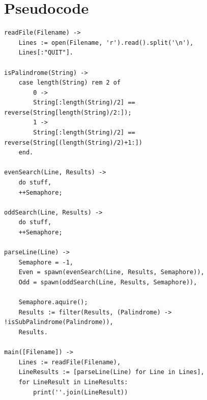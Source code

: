 \documentclass{article}
\begin{document}
\newpage

\section{Pseudocode}
\vspace{-12pt}
\begin{verbatim}
readFile(Filename) ->
    Lines := open(Filename, 'r').read().split('\n'),
    Lines[:"QUIT"].

isPalindrome(String) ->
    case length(String) rem 2 of
        0 ->
        String[:length(String)/2] == reverse(String[length(String)/2:]);
        1 ->
        String[:length(String)/2] == reverse(String[(length(String)/2)+1:])
    end.

evenSearch(Line, Results) ->
    do stuff,
    ++Semaphore;

oddSearch(Line, Results) ->
    do stuff,
    ++Semaphore;

parseLine(Line) ->
    Semaphore = -1,
    Even = spawn(evenSearch(Line, Results, Semaphore)),
    Odd = spawn(oddSearch(Line, Results, Semaphore)),
    
    Semaphore.aquire();
    Results := filter(Results, (Palindrome) -> !isSubPalindrome(Palindrome)),
    Results.

main([Filename]) ->
    Lines := readFile(Filename),
    LineResults := [parseLine(Line) for Line in Lines],
    for LineResult in LineResults:
        print(''.join(LineResult))

\end{verbatim}
\end{document}
